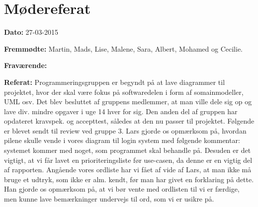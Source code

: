 \chapter{Mødereferat}

\textbf{Dato:} 27-03-2015

\textbf{Fremmødte:} Martin, Mads, Lise, Malene, Sara, Albert, Mohamed og Cecilie.

\textbf{Fraværende:} 

\textbf{Referat:}
Programmeringsgruppen er begyndt på at lave diagrammer til projektet, hvor der skal være fokus på softwaredelen i form af somainmodeller, UML osv. Det blev besluttet af gruppens medlemmer, at man ville dele sig op og lave div. mindre opgaver i uge 14 hver for sig.
Den anden del af gruppen har opdateret kravspek. og accepttest, således at den nu passer til projektet. Følgende er blevet sendt til review ved gruppe 3. Lars gjorde os opmærksom på, hvordan pilene skulle vende i vores diagram til login system med følgende kommentar: systemet kommer med noget, som programmet skal behandle på. Desuden er det vigtigt, at vi får lavet en prioriteringsliste før use-casen, da denne er en vigtig del af rapporten.
 Angående vores ordliste har vi fået af vide af Lars, at man ikke må bruge et udtryk, som ikke er alm. kendt, før man har givet en forklaring på dette. Han gjorde os opmærksom på, at vi bør vente med ordlisten til vi er færdige, men kunne lave bemærkninger undervejs til ord, som vi er usikre på.

